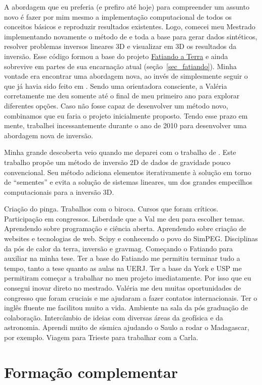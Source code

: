\documentclass[10pt,a4paper,oneside]{book}
\begin{document}
A abordagem que eu preferia (e prefiro até hoje) para compreender um assunto
novo é fazer por mim mesmo a implementação computacional de todos os conceitos
básicos e reproduzir resultados existentes.
Logo, comecei meu Mestrado implementando novamente o método de \citet{Nagy2000}
e toda a base para gerar dados sintéticos, resolver problemas inversos lineares
3D e visualizar em 3D os resultados da inversão.
Esse código formou a base do projeto
\href{https://www.fatiando.org}{Fatiando a Terra} e ainda sobrevive em partes
de sua encarnação atual (seção~\ref{sec_fatiando}).
Minha vontade era encontrar uma abordagem nova, ao invés de simplesmente seguir
o que já havia sido feito em \citet{SilvaDias2009}.
Sendo uma orientadora consciente, a Valéria corretamente me deu somente até o
final de meu primeiro ano para explorar diferentes opções.
Caso não fosse capaz de desenvolver um método novo, combinamos que eu faria o
projeto inicialmente proposto.
Tendo esse prazo em mente, trabalhei incessantemente durante o ano de 2010 para
desenvolver uma abordagem nova de inversão.

Minha grande descoberta veio quando me deparei com o trabalho de
\citet{Rene1986}.
Este trabalho propõe um método de inversão 2D de dados de gravidade pouco
convencional.
Seu método adiciona elementos iterativamente à solução em torno de ``sementes''
e evita a solução de sistemas lineares, um dos grandes empecilhos
computacionais para a inversão 3D.

Criação do pinga.
Trabalhos com o biroca.
Cursos que foram críticos.
Participação em congressos.
Liberdade que a Val me deu para escolher temas.
Aprendendo sobre programação e ciência aberta.
Aprendendo sobre criação de websites e tecnologias de web.
Scipy e conhecendo o povo do SimPEG.
Disciplinas da pós de calor da terra, inversão e gravmag.
Começando o Fatiando para auxiliar na minha tese.
Ter a base do Fatiando me permitiu terminar tudo a tempo, tanto a tese quanto
as aulas na UERJ.
Ter a base da York e USP me permitiram começar a trabalhar no meu projeto imediatamente.
Por isso que eu consegui inovar direto no mestrado.
Valéria me deu muitas oportunidades de congresso que foram cruciais e me ajudaram a fazer contatos internacionais.
Ter o inglês fluente me facilitou muito a vida.
Ambiente na sala da pós graduação de colaboração.
Intercâmbio de ideias com diversas áreas da geofísica e da astronomia.
Aprendi muito de sísmica ajudando o Saulo a rodar o Madagascar, por exemplo.
Viagem para Trieste para trabalhar com a Carla.


\section{Formação complementar}
\end{document}
